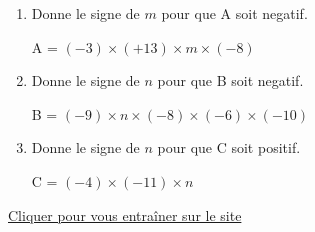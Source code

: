 \begin{exercice*}    
        \begin{enumerate}
            \item Donne le signe de $ m $ pour que A soit negatif.
            
            A = $ (-3) \times (+13)\times m\times (-8) $
            \item Donne le signe de $ n $ pour que B soit negatif. 
            
            B = $ (-9) \times n\times (-8)\times (-6)\times (-10) $ 
            \item Donne le signe de $ n $ pour que C soit positif. 
            
            C = $ (-4) \times (-11)\times n $
        \end{enumerate}

    \href{https://coopmaths.fr/mathalea.html?ex=4C10-6,s=1,n=3,cd=1,i=1&v=l}{Cliquer pour vous entraîner sur le site \mathaleaLogo} 
\end{exercice*}
